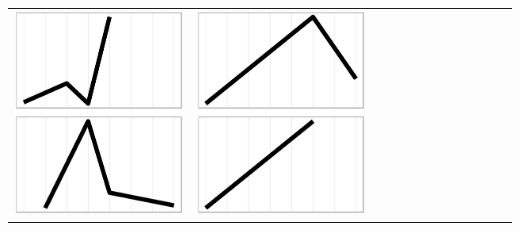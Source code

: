 \documentclass[conference]{worldcomp}
\begin{document}
\begin{table}
\begin{tabular}{ | b{1.5cm} | c | c | c | c | c | c | c | c | c | c | c |}
 \includegraphics[scale=0.08]{figures/abca.ps} &  
 \includegraphics[scale=0.08]{figures/babc.ps} &  

\end{tabular}
\end{table}
\end{document}
